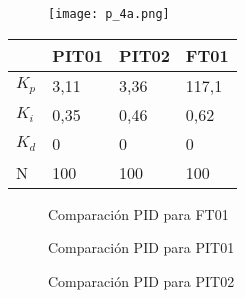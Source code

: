 {\begin{figure}[h!]
	\centering
	\texttt{[image: p\_4a.png]}
	\label{fig:LCs}
\end{figure}

\begin{comment}
Se observa que algunos de los controladores PID son del tipo proporcional integrador, dando así ya que la ganancia en los diferentes escalones en la planta no era constante. Al utilizar un PI genera una salida con error de estado estacionario cero. 
\end{comment}

\begin{table}[h]
	\centering
	\begin{tabular}{|l|l|l|l|}
		\hline
		& PIT01 & PIT02 & FT01 \\ \hline
		$K_p$ & 3,11 & 3,36 & 117,1 \\ \hline
		$K_i$ & 0,35 & 0,46 & 0,62 \\ \hline
		$K_d$ & 0 & 0 & 0 \\ \hline
		N & 100 & 100 & 100 \\ \hline
	\end{tabular}
	\label{tab:pid}
\end{table}

\begin{comment}
	C:\Users\glori\Desktop\DANIELA\VISUAL_DANI\Automa\MATLAB\22-05\Comparacion PID y PLANTAS\FT01
	Respuesta_Strenj
\end{comment}






\begin{figure}[htbp]
	\centering
\hspace{-4mm}
	\caption{Comparación PID para FT01} \label{fig:FT1}
\end{figure}

\begin{figure}[htbp]
	\centering
\hspace{-4mm}
	\caption{Comparación PID para PIT01} \label{fig:PIT1}
\end{figure}

\begin{figure}[htbp]
	\centering
	\hspace{-4mm}
	\caption{Comparación PID para PIT02} \label{fig:PIT2}
\end{figure}


}
